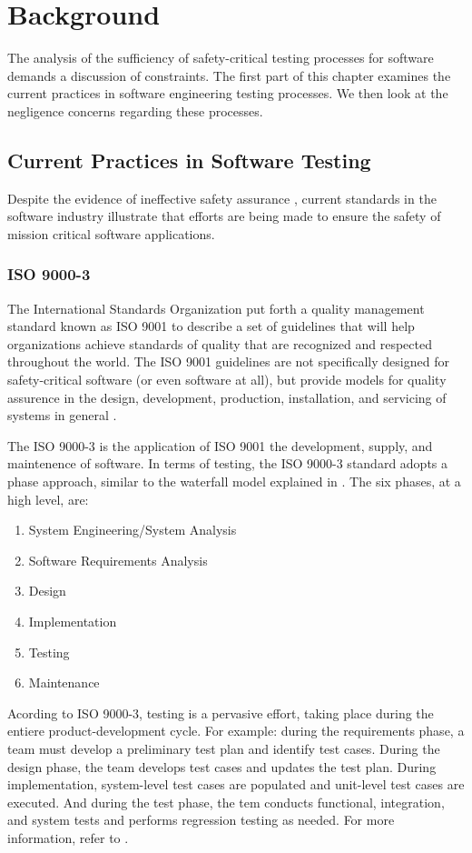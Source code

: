 \chapter{Background}\label{C:Background}
The analysis of the sufficiency of safety-critical testing processes for
software demands a discussion of constraints. The first part of this chapter
examines the current practices in software engineering testing processes. We
then look at the negligence concerns regarding these processes.

\section{Current Practices in Software Testing}
Despite the evidence of ineffective safety assurance \cite{Leveson93,Maisel05},
current standards in the software industry illustrate that efforts are being
made to ensure the safety of mission critical software applications.


\subsection{ISO 9000-3}
The International Standards Organization put forth a quality management standard
known as ISO 9001 to describe a set of guidelines that will help organizations
achieve standards of quality that are recognized and respected throughout the
world. The ISO 9001 guidelines are not specifically designed for safety-critical
software (or even software at all), but provide models for quality assurence
in the design, development, production, installation, and servicing of systems
in general \cite{Kehoe96}.

The ISO 9000-3 is the application of ISO 9001 the development, supply, and
maintenence of software. In terms of testing, the ISO 9000-3 standard adopts a
phase approach, similar to the waterfall model explained in \cite{Royce70}. The
six phases, at a high level, are:
\singlespace
\begin{enumerate}
  \item System Engineering/System Analysis
  \item Software Requirements Analysis
  \item Design
  \item Implementation
  \item Testing
  \item Maintenance
\end{enumerate}
\doublespace
Acording to ISO 9000-3, testing is a pervasive effort, taking place during the
entiere product-development cycle. For example: during the requirements phase, a
team must develop a preliminary test plan and identify test cases. During the
design phase, the team develops test cases and updates the test plan. During
implementation, system-level test cases are populated and unit-level test cases
are executed. And during the test phase, the tem conducts functional,
integration, and system tests and performs regression testing as needed. For
more information, refer to \cite{Kehoe96}.


